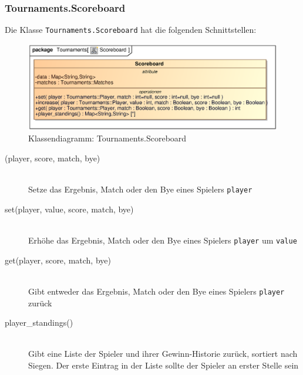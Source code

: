 \subsubsection{Tournaments.Scoreboard}
Die Klasse \verb|Tournaments.Scoreboard| hat die folgenden Schnittstellen:
\begin{figure}[H]
    \myfloatalign
    \includegraphics[width=\textwidth]{gfx/MtGDeepAnalysis/Scoreboard.eps}
    \caption{Klassendiagramm: Tournaments.Scoreboard}
    \label{fig:class:Tournaments.Scoreboard}
\end{figure}
\begin{description}
    \item[(player, score, match, bye)] \hfill \\
    Setze das Ergebnis, Match oder den Bye eines Spielers \verb|player|
     
    \item[set(player, value, score, match, bye)] \hfill \\
    Erhöhe das Ergebnis, Match oder den Bye eines Spielers \verb|player| um \verb|value|
    
    \item[get(player, score, match, bye)] \hfill \\
    Gibt entweder das Ergebnis, Match oder den Bye eines Spielers \verb|player| zurück
    
    \item[player\_standings()] \hfill \\
    Gibt eine Liste der Spieler und ihrer Gewinn-Historie zurück, sortiert nach Siegen. Der erste Eintrag in der Liste sollte der Spieler an erster Stelle sein
\end{description}

